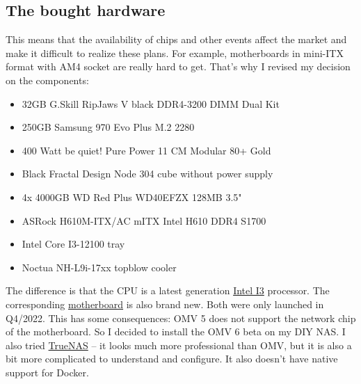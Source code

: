 \subsection{The bought hardware}


\begin{figure}[H]
    \centering
    \begin{Huge}
    \end{Huge}
\end{figure}

This means that the availability of chips and other events affect the market
and make it difficult to realize these plans. For example, motherboards in
mini-ITX format with AM4 socket are really hard to get. That's why I revised
my decision on the components:

\begin{itemize}
    \item 32GB G.Skill RipJaws V black DDR4-3200 DIMM Dual Kit
    \item 250GB Samsung 970 Evo Plus M.2 2280
    \item 400 Watt be quiet! Pure Power 11 CM Modular 80+ Gold
    \item Black Fractal Design Node 304 cube without power supply
    \item 4x 4000GB WD Red Plus WD40EFZX 128MB 3.5"
    \item ASRock H610M-ITX/AC mITX Intel H610 DDR4 S1700
    \item Intel Core I3-12100 tray
    \item Noctua NH-L9i-17xx topblow cooler
\end{itemize}

The difference is that the CPU is a latest generation
\href{https://www.intel.com/content/www/us/en/products/sku/134584/intel-core-i312100-processor-12m-cache-up-to-4-30-ghz/specifications.html?wapkw=12100}{Intel I3}
processor. The corresponding
\href{https://www.asrock.com/MB/Intel/H610M-ITXac/index.de.asp}{motherboard}
is also brand new. Both were only launched in Q4/2022. This has some
consequences: \gls{OMV} 5 does not support the network chip of the motherboard.
So I decided to install the \gls{OMV} 6 beta on my DIY \gls{NAS}. I also tried
\href{https://www.truenas.com/}{TrueNAS} -- it looks much more professional
than \gls{OMV}, but it is also a bit more complicated to understand and
configure. It also doesn't have native support for \gls{Docker}.
